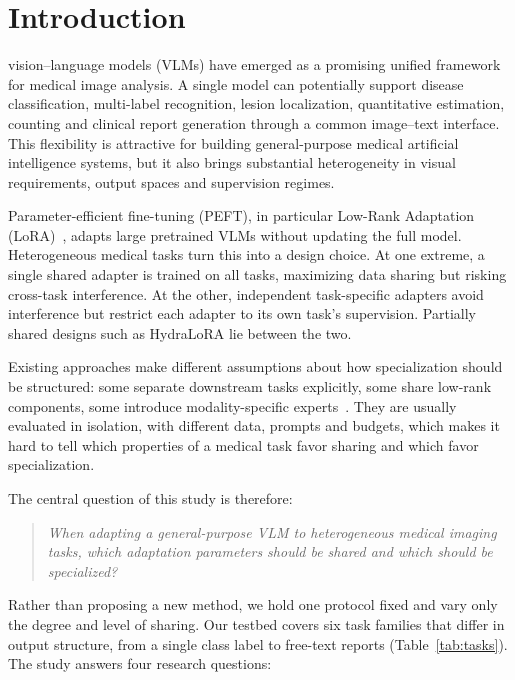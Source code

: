 \documentclass[journal,twoside,web]{ieeecolor}
\begin{document}
\section{Introduction}
\label{sec:introduction}

 vision--language models (VLMs) have emerged
as a promising unified framework for medical image analysis. A single model
can potentially support disease classification, multi-label recognition,
lesion localization, quantitative estimation, counting and clinical report
generation through a common image--text interface. This flexibility is
attractive for building general-purpose medical artificial intelligence
systems, but it also brings substantial heterogeneity in visual
requirements, output spaces and supervision regimes.

Parameter-efficient fine-tuning (PEFT), in particular Low-Rank Adaptation
(LoRA)~\cite{hu2022lora}, adapts large pretrained VLMs without updating the
full model. Heterogeneous medical tasks turn this into a design choice. At
one extreme, a single shared adapter is trained on all tasks, maximizing
data sharing but risking cross-task interference. At the other, independent
task-specific adapters avoid interference but restrict each adapter to its
own task's supervision. Partially shared designs such as
HydraLoRA lie between the two.

Existing approaches make different assumptions about how specialization
should be structured: some separate downstream tasks explicitly, some share
low-rank components, some introduce modality-specific
experts~\cite{jiang2024medmoe}. They are usually evaluated in isolation,
with different data, prompts and budgets, which makes it hard to tell which
properties of a medical task favor sharing and which favor specialization.

The central question of this study is therefore:

\begin{quote}
\emph{When adapting a general-purpose VLM to heterogeneous medical imaging
tasks, which adaptation parameters should be shared and which should be
specialized?}
\end{quote}

Rather than proposing a new method, we hold one protocol fixed and vary only
the degree and level of sharing. Our testbed covers six task families that
differ in output structure, from a single class label to free-text reports
(Table~\ref{tab:tasks}). The study answers four research questions:
\end{document}
